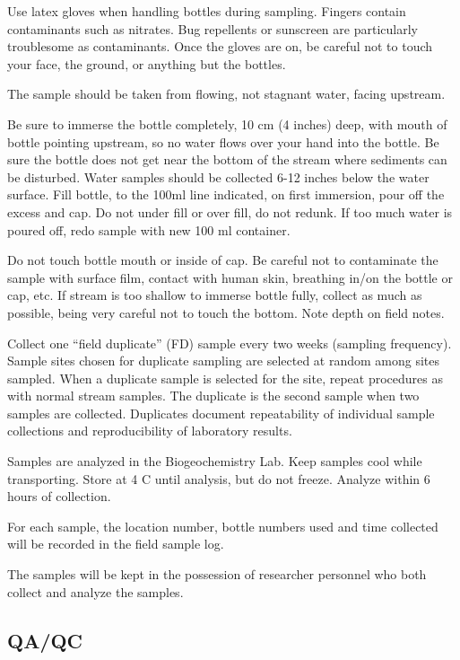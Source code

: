 \documentclass[12pt]{../SOP4_alpha}\usepackage[]{graphicx}\usepackage[]{xcolor}
\begin{document}
\NP Use latex gloves when handling bottles during sampling. Fingers contain
contaminants such as nitrates. Bug repellents or sunscreen are particularly 
troublesome as contaminants. Once the gloves are on, be careful not to touch
your face, the ground, or anything but the bottles.

\NP The sample should be taken from flowing, not stagnant water, facing
upstream.

\NP Be sure to immerse the bottle completely, 10 cm (4 inches) deep, with
mouth of bottle pointing upstream, so no water flows over your hand into the
bottle. Be sure the bottle does not get near the bottom of the stream where
sediments can be disturbed. Water samples should be collected 6-12 inches
below the water surface. Fill bottle, to the 100ml line indicated, on first
immersion, pour off the excess and cap. Do not under fill or over fill, do not
redunk. If too much water is poured off, redo sample with new 100 ml
container.

\NP Do not touch bottle mouth or inside of cap. Be careful not to
contaminate the sample with surface film, contact with human skin, breathing
in/on the bottle or cap, etc. If stream is too shallow to immerse bottle fully, collect as much as possible, being very careful not to touch the bottom. Note depth on field notes.

\NP Collect one ``field duplicate'' (FD) sample every two weeks (sampling frequency).
Sample sites chosen for duplicate sampling are selected at random among
sites sampled. When a duplicate sample is selected for the site, repeat
procedures as with normal stream samples. The duplicate is the second
sample when two samples are collected. Duplicates document repeatability of
individual sample collections and reproducibility of laboratory results.

\NP Samples are analyzed in the Biogeochemistry Lab. Keep samples cool
while transporting. Store at 4 \degree C until analysis, but do not freeze. Analyze within 6 hours of collection.

\NP For each sample, the location number, bottle numbers used and time
collected will be recorded in the field sample log.

\NP The samples will be kept in the possession of researcher personnel who both collect and analyze the samples.


\subsection{QA/QC}
\end{document}
